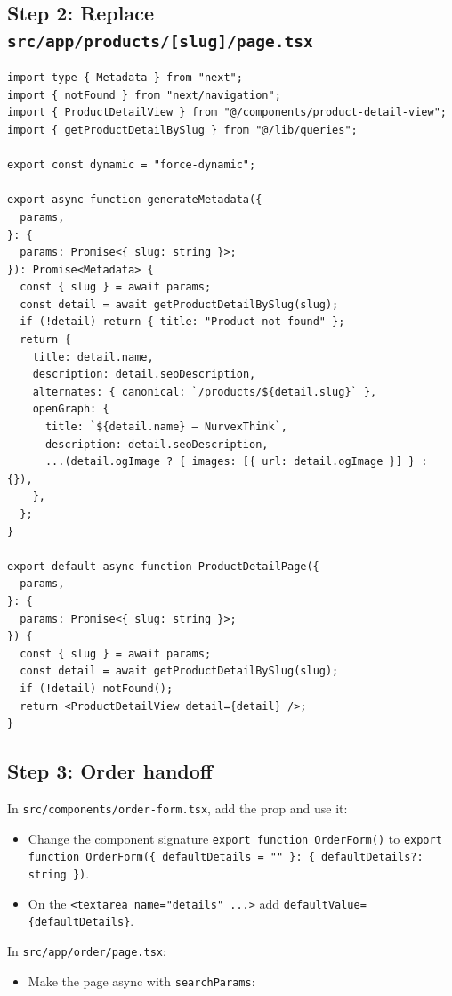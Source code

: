 \documentclass[11pt,a4paper]{article}
\begin{document}
\subsection*{Step 2: Replace \texttt{src/app/products/[slug]/page.tsx}}

\begin{lstlisting}
import type { Metadata } from "next";
import { notFound } from "next/navigation";
import { ProductDetailView } from "@/components/product-detail-view";
import { getProductDetailBySlug } from "@/lib/queries";

export const dynamic = "force-dynamic";

export async function generateMetadata({
  params,
}: {
  params: Promise<{ slug: string }>;
}): Promise<Metadata> {
  const { slug } = await params;
  const detail = await getProductDetailBySlug(slug);
  if (!detail) return { title: "Product not found" };
  return {
    title: detail.name,
    description: detail.seoDescription,
    alternates: { canonical: `/products/${detail.slug}` },
    openGraph: {
      title: `${detail.name} — NurvexThink`,
      description: detail.seoDescription,
      ...(detail.ogImage ? { images: [{ url: detail.ogImage }] } : {}),
    },
  };
}

export default async function ProductDetailPage({
  params,
}: {
  params: Promise<{ slug: string }>;
}) {
  const { slug } = await params;
  const detail = await getProductDetailBySlug(slug);
  if (!detail) notFound();
  return <ProductDetailView detail={detail} />;
}
\end{lstlisting}

\subsection*{Step 3: Order handoff}

In \texttt{src/components/order-form.tsx}, add the prop and use it:
\begin{itemize}
  \item Change the component signature \texttt{export function OrderForm()} to
        \texttt{export function OrderForm(\{ defaultDetails = "" \}: \{ defaultDetails?: string \})}.
  \item On the \texttt{<textarea name="details" ...>} add \texttt{defaultValue=\{defaultDetails\}}.
\end{itemize}

In \texttt{src/app/order/page.tsx}:
\begin{itemize}
  \item Make the page async with \texttt{searchParams}:
\end{itemize}
\end{document}
